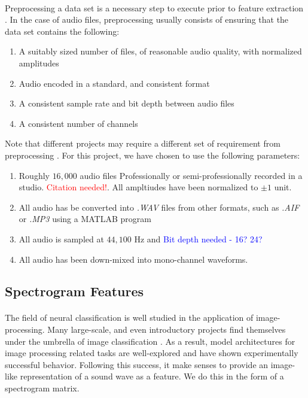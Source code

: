 \documentclass[12pt,letterpaper]{article}
\begin{document}
\paragraph*{}Preprocessing a data set is a necessary step to execute prior to feature extraction \cite{Geron2,James}. In the case of audio files, preprocessing usually consists of ensuring that the data set contains the following:
\begin{enumerate}
\item A suitably sized number of files, of reasonable audio quality, with normalized amplitudes
\item Audio encoded in a standard, and consistent format
\item A consistent sample rate and bit depth between audio files
\item A consistent number of channels
\end{enumerate}
Note that different projects may require a different set of requirement from preprocessing \cite{Virtanen}. For this project, we have chosen to use the following parameters:
\begin{enumerate}
\item Roughly $16,000$ audio files Professionally or semi-professionally recorded in a studio. \textcolor{red}{Citation needed!}. All ampltiudes have been normalized to $\pm 1$ unit.
\item All audio has be converted into \textit{.WAV} files from other formats, such as \textit{.AIF} or \textit{.MP3} using a MATLAB program
\item All audio is sampled at $44,100$ Hz and \textcolor{blue}{Bit depth needed - 16? 24?}
\item All audio has been down-mixed into mono-channel waveforms.
\end{enumerate}


\newpage

\subsection{Spectrogram Features}
\label{subsec-spectrogram}

\paragraph*{}The field of neural classification is well studied in the application of image-processing. Many large-scale, and even introductory projects find themselves under the umbrella of image classification \cite{Geron,Goodfellow,Loy,Mierswa}. As a result, model architectures for image processing related tasks are well-explored and have shown experimentally successful behavior. Following this success, it make senses to provide an image-like representation of a sound wave as a feature. We do this in the form of a spectrogram matrix.
\end{document}
